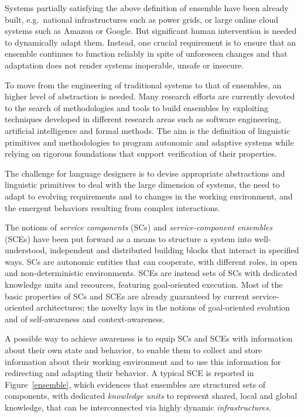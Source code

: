 \documentclass[11pt]{article}
\begin{document}
Systems partially satisfying the above definition of ensemble have been already built, e.g.\ national infrastructures such as power grids, or large online cloud systems such as Amazon or Google. But significant human intervention is needed to dynamically adapt them. Instead, one crucial requirement is to ensure that an ensemble continues to function reliably in spite of unforeseen changes and that adaptation does not render systems inoperable, unsafe or insecure.

To move from the engineering of traditional systems to that of ensembles, an higher level of abstraction is needed. Many research efforts are  currently devoted to the search of  methodologies and tools to build ensembles by exploiting techniques developed in different research areas such as software engineering, artificial intelligence and formal methods. The aim is the definition of linguistic primitives and methodologies to program autonomic and adaptive systems while relying on rigorous foundations that support verification of their properties.

The challenge for language designers is to devise appropriate abstractions and linguistic primitives to deal with the large dimension of systems, the need to adapt to evolving requirements and to changes in the working environment, and the emergent behaviors resulting from complex interactions.

The notions of \emph{service components} (SCs) and \emph{service-component ensembles} (SCEs) have been put forward as a means to structure a system into well-understood, independent and distributed building blocks that interact in specified ways. SCs are autonomic entities that can cooperate, with different roles, in open and non-deterministic environments. SCEs are instead sets of SCs with dedicated knowledge units and resources, featuring goal-oriented execution. Most of the basic properties of SCs and SCEs are already guaranteed by current service-oriented architectures; the novelty lays in the notions of goal-oriented evolution and of self-awareness and context-awareness.

A possible way to achieve awareness is to equip SCs and SCEs with information about their own state and behavior, to enable them to collect and store information about their working environment and to use this information for redirecting and adapting their behavior. A typical SCE is reported in Figure~\ref{ensemble}, which evidences that ensembles are structured sets of components, with dedicated \emph{knowledge units} to represent shared, local and global knowledge, that can be interconnected via highly dynamic \emph{infrastructures}.
\end{document}
